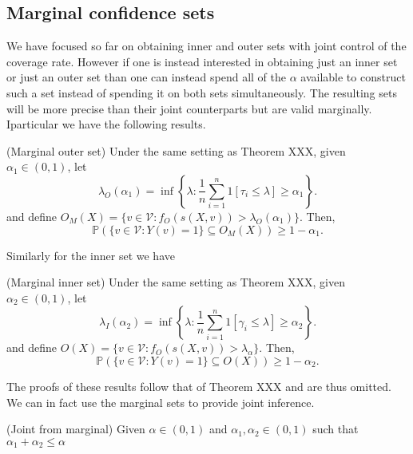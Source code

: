 \subsection{Marginal confidence sets}
We have focused so far on obtaining inner and outer sets with joint control of the coverage rate. However if one is instead interested in obtaining just an inner set  or just an outer set than one can instead spend all of the $\alpha$ available to construct such a set instead of spending it on both sets simultaneously. The resulting sets will be more precise than their joint counterparts but are valid marginally. Iparticular we have the following results. 

\begin{theorem}
	(Marginal outer set)
	Under the same setting as Theorem XXX, given $\alpha_1 \in (0,1)$, let 
	\begin{equation*}
		\lambda_O({\alpha_1})= \inf\left\lbrace \lambda: \frac{1}{n} \sum_{i = 1}^n 1\left[ \tau_i\leq \lambda \right] \geq \alpha_1 \right\rbrace.
	\end{equation*}
	and define $O_M(X) = \lbrace v \in \mathcal{V}: f_O(s(X,v)) > 	\lambda_O({\alpha_1}) \rbrace $. Then,
	\begin{equation}\label{eq:probstat}
		\mathbb{P}\left( \lbrace v\in \mathcal{V}: Y(v) = 1 \rbrace \subseteq O_M(X) \right) \geq 1 - \alpha_1.
	\end{equation}
\end{theorem}
Similarly for the inner set we have
\begin{theorem}
	(Marginal inner set)
	Under the same setting as Theorem XXX, given $\alpha_2 \in (0,1)$, let 
	\begin{equation*}
		\lambda_I(\alpha_2) = \inf\left\lbrace \lambda: \frac{1}{n} \sum_{i = 1}^n 1\left[ \gamma_i\leq \lambda \right] \geq \alpha_2 \right\rbrace.
	\end{equation*}
	and define $O(X) = \lbrace v \in \mathcal{V}: f_O(s(X,v)) > \lambda_{\alpha} \rbrace $. Then,
	\begin{equation}\label{eq:probstat}
		\mathbb{P}\left( \lbrace v\in \mathcal{V}: Y(v) = 1 \rbrace \subseteq O(X) \right) \geq 1 - \alpha_2.
	\end{equation}
\end{theorem}
The proofs of these results follow that of Theorem XXX and are thus omitted. We can in fact use the marginal sets to provide joint inference.
\begin{corollary}\label{cor:weighting}
	(Joint from marginal) Given $\alpha \in (0,1)$ and $\alpha_1, \alpha_2 \in (0,1)$ such that $\alpha_1 + \alpha_2 \leq \alpha$
\end{corollary}

